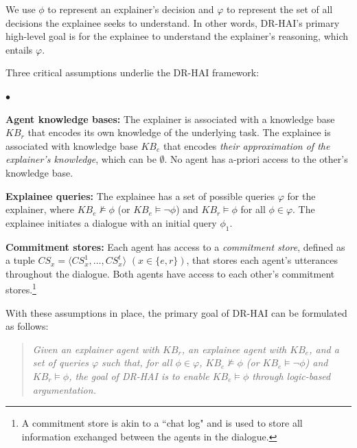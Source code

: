 \documentclass[letterpaper]{article} %
\newcommand{\squishlist}{
\begin{list}{$\bullet$}{ 
    \setlength{\itemsep}{1pt}
    \setlength{\parsep}{0pt}
    \setlength{\topsep}{1.5pt}
    \setlength{\partopsep}{0pt}
    \setlength{\leftmargin}{1em}
    \setlength{\labelwidth}{1em}
    \setlength{\labelsep}{0.5em} } }
\newcommand{\squishend}{\end{list}  }
\begin{document}
We use $\phi$ to represent an explainer's decision and $\varphi$ to represent the set of all decisions the explainee seeks to understand. In other words, DR-HAI's primary high-level goal is for the explainee to understand the explainer's reasoning, which entails $\varphi$.

Three critical assumptions underlie the DR-HAI framework:


\squishlist
    \item \textbf{Agent knowledge bases:} The explainer is associated with a knowledge base $KB_r$ that encodes its own knowledge of the underlying task. The explainee is associated with knowledge base $KB_e$ that encodes \emph{their approximation of the explainer's knowledge}, which can be $\emptyset$. No agent has a-priori access to the other's knowledge base.
    
    
    \item \textbf{Explainee queries:} The explainee has a set of possible queries $\varphi$ for the explainer, %
    where $KB_e \not \models \phi$ (or $KB_e \models \neg \phi$) and $KB_r \models \phi$ for all $\phi \in \varphi$. The explainee initiates a dialogue with an initial \mbox{query} $\phi_1$.


    \item \textbf{Commitment stores:} Each agent has access to a \emph{commitment store}, defined as a tuple $CS_x = \langle CS_x^1, \ldots, CS_x^t \rangle$ $(x\in \{e, r\})$, that stores each agent's utterances throughout the dialogue. Both agents have access to each other's commitment stores.\footnote{A commitment store is akin to a ``chat log" and is used to store all information exchanged between the agents in the dialogue.}
    
\squishend

\noindent With these assumptions in place, the primary goal of DR-HAI can be formulated as follows:


\begin{quote}
    \emph{Given an explainer agent with $KB_r$, an explainee agent with $KB_e$, and a set of queries $\varphi$ such that, for all $\phi \in \varphi$, $KB_e \not \models \phi$ (or $KB_e \models \neg \phi$) and $KB_r \models \phi$, the goal of DR-HAI is to \emph{enable} $KB_e \models \phi$ through logic-based argumentation.}
\end{quote}
\end{document}
